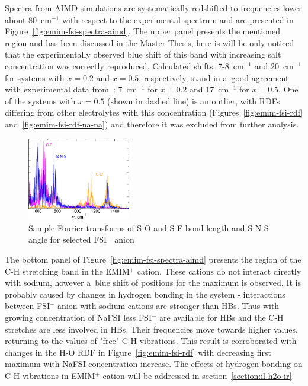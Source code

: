 Spectra from AIMD simulations are systematically redshifted to frequencies lower about 80~cm$^{-1}$ with respect to the experimental spectrum and are presented in Figure~\ref{fig:emim-fsi-spectra-aimd}. The upper panel presents the mentioned region and has been discussed in the Master Thesis, here is will be only noticed that the experimentally observed blue shift of this band with increasing salt concentration was correctly reproduced. Calculated shifts: 7-8~cm$^{-1}$ and 20~cm$^{-1}$ for systems with $x = 0.2$ and $x = 0.5$, respectively, stand in a~good agreement with experimental data from~\cite{na-il-1}: 7~cm$^{-1}$ for $x = 0.2$ and 17~cm$^{-1}$ for $x = 0.5$. One of the systems with $x = 0.5$ (shown in dashed line) is an outlier, with RDFs differing from other electrolytes with this concentration (Figures~\ref{fig:emim-fsi-rdf} and~\ref{fig:emim-fsi-rdf-na-na}) and therefore it was excluded from further analysis.

\begin{figure}[H]
    \centering
    \includegraphics[width=0.4\textwidth]{img/4-ir-spectra-from-aimd-simulations/1-emim-fsi/fourier-samples.png}
    \singlespacing
    \caption{Sample Fourier  transforms of S-O and S-F bond length and S-N-S angle for selected FSI$^{-}$ anion}
    \label{fig:emim-fsi-fourier-samples}
\end{figure}

The bottom panel of Figure~\ref{fig:emim-fsi-spectra-aimd} presents the region of the C-H stretching band in the EMIM$^{+}$ cation. These cations do not interact directly with sodium, however a~blue shift of positions for the maximum is observed. It is probably caused by changes in hydrogen bonding in the system - interactions between FSI$^{-}$ anion with sodium cations are stronger than HBs. Thus with growing concentration of NaFSI less FSI$^{-}$ are available for HBs and the C-H stretches are less involved in HBs. Their frequencies move towards higher values, returning to the values of "free" C-H vibrations. This result is corroborated with changes in the H-O RDF in Figure~\ref{fig:emim-fsi-rdf} with decreasing first maximum with NaFSI concentration increase. The effects of hydrogen bonding on C-H vibrations in EMIM$^{+}$ cation will be addressed in section~\ref{section:il-h2o-ir}.

